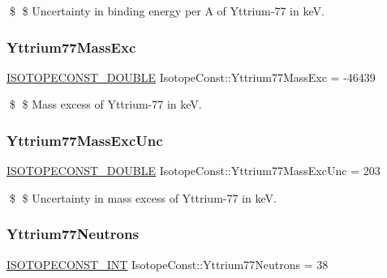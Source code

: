 \$ \$ Uncertainty in binding energy per A of Yttrium-\/77 in keV. \mbox{\label{group___isotope_const-_yttrium-_y77_gad6ab81b3c2e82c7bf55a696b14ce125a}} 
\subsubsection{\texorpdfstring{Yttrium77\+Mass\+Exc}{Yttrium77MassExc}}
{\footnotesize\ttfamily \mbox{\hyperlink{group___isotope_const-_macros_ga8f45a7272ce02c0b4c65c44636ed719a}{I\+S\+O\+T\+O\+P\+E\+C\+O\+N\+S\+T\+\_\+\+D\+O\+U\+B\+LE}} Isotope\+Const\+::\+Yttrium77\+Mass\+Exc = -\/46439}

\$ \$ Mass excess of Yttrium-\/77 in keV. \mbox{\label{group___isotope_const-_yttrium-_y77_gae7967e7ed27850b8ef462752b950bda6}} 
\subsubsection{\texorpdfstring{Yttrium77\+Mass\+Exc\+Unc}{Yttrium77MassExcUnc}}
{\footnotesize\ttfamily \mbox{\hyperlink{group___isotope_const-_macros_ga8f45a7272ce02c0b4c65c44636ed719a}{I\+S\+O\+T\+O\+P\+E\+C\+O\+N\+S\+T\+\_\+\+D\+O\+U\+B\+LE}} Isotope\+Const\+::\+Yttrium77\+Mass\+Exc\+Unc = 203}

\$ \$ Uncertainty in mass excess of Yttrium-\/77 in keV. \mbox{\label{group___isotope_const-_yttrium-_y77_gabff31de53bf30befc494396183b6be03}} 
\subsubsection{\texorpdfstring{Yttrium77\+Neutrons}{Yttrium77Neutrons}}
{\footnotesize\ttfamily \mbox{\hyperlink{group___isotope_const-_macros_ga5f18360b3e99483a35c32d789e62621c}{I\+S\+O\+T\+O\+P\+E\+C\+O\+N\+S\+T\+\_\+\+I\+NT}} Isotope\+Const\+::\+Yttrium77\+Neutrons = 38}

